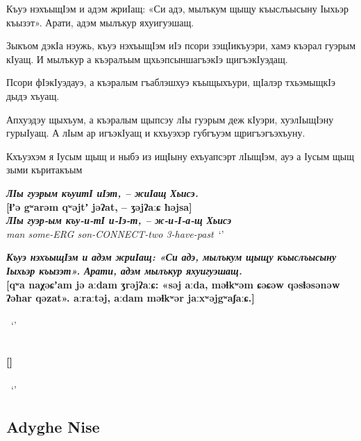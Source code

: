 \documentclass[a4paper,12pt]{book}
\newcommand{\1}[1]{\textbf{\emph{#1}}} %
\newcommand{\2}[1]{\textbf{[#1]}} %
\newcommand{\3}[1]{\fontsize{11pt}{0cm}\textbf{\emph{#1}}} %
\newcommand{\4}[1]{\fontsize{10pt}{0cm}\emph{#1}}	%
\newcommand{\5}[1]{\textbf{/#1/}} %
\newcommand{\6}[1]{\textbf{[#1]}} %
\newcommand{\7}[1]{\fontsize{12pt}{0cm}\emph{#1}} %
\newcommand{\8}[1]{\fontsize{12pt}{0cm}`#1'} %
\newcommand{\9}[1]{\fontsize{12pt}{0cm}(lit. `#1')} %
\begin{document}
Къуэ нэхъыщӀэм и адэм жриӀащ: «Си адэ, мылъкум щыщу къыслъысыну Ӏыхьэр къызэт». Арати, адэм мылъкур яхуигуэшащ.

Зыкъом дэкӀа нэужь, къуэ нэхъыщӀэм иӀэ псори зэщӀикъуэри, хамэ къэрал гуэрым кӀуащ. И мылъкур а къэралъым щхьэпсыншагъэкӀэ щигъэкӀуэдащ. 

Псори фӀэкӀуэдауэ, а къэралым гъаблэшхуэ къыщыхъури, щӀалэр тхьэмыщкӀэ дыдэ хъуащ. 

Апхуэдэу щыхъум, а къэралым щыпсэу лӀы гуэрым деж кӀуэри, хуэлӀыщӀэну гурыӀуащ. А лӀым ар игъэкӀуащ и кхъуэхэр губгъуэм щригъэгъэхъуну.

Кхъуэхэм я Ӏусым щыщ и ныбэ из ищӀыну ехъуапсэрт лӀыщӀэм, ауэ а Ӏусым щыщ зыми къритакъым

\begin{exe}
\ex
\1{ЛӀы гуэрым къуитӀ иӀэт, – жиӀащ Хьисэ.}\\
\2{ɬʼə gʷarəm qʷəjtʼ jəʔat, – ʒəjʔaːɕ ħəjsa}\\
\3{ЛӀы гуэр-ым къу-и-тӀ и-Ӏэ-т, – ж-и-Ӏ-а-щ Хьисэ}\\
\4{man some-ERG son-CONNECT-two 3-have-past}\
\trans \8{}

\ex
\1{Къуэ нэхъыщӀэм и адэм жриӀащ: «Си адэ, мылъкум щыщу къыслъысыну Ӏыхьэр къызэт». Арати, адэм мылъкур яхуигуэшащ.}\\
\2{qʷa naχəɕʼam jə aːdam ʒrəjʔaːɕ: «səj aːda, məɬkʷəm ɕəɕəw qəsɬəsənəw ʔəħar qəzat». aːraːtəj, aːdam məɬkʷər jaːxʷəjgʷaʃaːɕ.}\\
\3{}\\
\4{}\
\trans \8{}


\ex
\1{}\\
\2{}\\
\3{}\\
\4{}\
\trans \8{}
\end{exe}


\subsection{Adyghe Nise}
\end{document}
